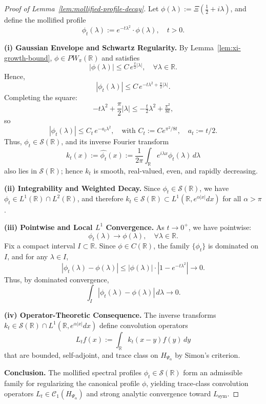 \begin{proof}[Proof of Lemma~\ref{lem:mollified-profile-decay}]
Let \( \phi(\lambda) := \Xi\left( \tfrac{1}{2} + i\lambda \right) \), and define the mollified profile
\[
\phi_t(\lambda) := e^{-t\lambda^2} \cdot \phi(\lambda), \quad t > 0.
\]

\medskip
\noindent\textbf{(i) Gaussian Envelope and Schwartz Regularity.}
By Lemma~\ref{lem:xi-growth-bound}, \( \phi \in PW_\pi(\mathbb{R}) \) and satisfies
\[
|\phi(\lambda)| \le C\, e^{\frac{\pi}{2} |\lambda|}, \quad \forall \lambda \in \mathbb{R}.
\]
Hence,
\[
|\phi_t(\lambda)| \le C\, e^{-t\lambda^2 + \frac{\pi}{2} |\lambda|}.
\]
Completing the square:
\[
-t\lambda^2 + \frac{\pi}{2}|\lambda| \le -\tfrac{t}{2}\lambda^2 + \tfrac{\pi^2}{8t},
\]
so
\[
|\phi_t(\lambda)| \le C_t\, e^{-a_t \lambda^2}, \quad \text{with } C_t := C e^{\pi^2/8t}, \quad a_t := t/2.
\]
Thus, \( \phi_t \in \mathcal{S}(\mathbb{R}) \), and its inverse Fourier transform
\[
k_t(x) := \widehat{\phi_t}(x) := \frac{1}{2\pi} \int_{\mathbb{R}} e^{i\lambda x} \phi_t(\lambda)\, d\lambda
\]
also lies in \( \mathcal{S}(\mathbb{R}) \); hence \( k_t \) is smooth, real-valued, even, and rapidly decreasing.

\medskip
\noindent\textbf{(ii) Integrability and Weighted Decay.}
Since \( \phi_t \in \mathcal{S}(\mathbb{R}) \), we have \( \phi_t \in L^1(\mathbb{R}) \cap L^2(\mathbb{R}) \), and therefore \( k_t \in \mathcal{S}(\mathbb{R}) \subset L^1(\mathbb{R}, e^{\alpha |x|} dx) \) for all \( \alpha > \pi \).

\medskip
\noindent\textbf{(iii) Pointwise and Local \( L^1 \) Convergence.}
As \( t \to 0^+ \), we have pointwise:
\[
\phi_t(\lambda) \to \phi(\lambda), \quad \forall \lambda \in \mathbb{R}.
\]
Fix a compact interval \( I \subset \mathbb{R} \). Since \( \phi \in C(\mathbb{R}) \), the family \( \{\phi_t\} \) is dominated on \( I \), and for any \( \lambda \in I \),
\[
|\phi_t(\lambda) - \phi(\lambda)| \le |\phi(\lambda)| \cdot |1 - e^{-t\lambda^2}| \to 0.
\]
Thus, by dominated convergence,
\[
\int_I |\phi_t(\lambda) - \phi(\lambda)|\, d\lambda \to 0.
\]

\medskip
\noindent\textbf{(iv) Operator-Theoretic Consequence.}
The inverse transforms \( k_t \in \mathcal{S}(\mathbb{R}) \cap L^1(\mathbb{R}, e^{\alpha |x|} dx) \) define convolution operators
\[
L_t f(x) := \int_{\mathbb{R}} k_t(x - y) f(y)\, dy
\]
that are bounded, self-adjoint, and trace class on \( H_{\Psi_\alpha} \) by Simon’s criterion.

\medskip
\noindent\textbf{Conclusion.}
The mollified spectral profiles \( \phi_t \in \mathcal{S}(\mathbb{R}) \) form an admissible family for regularizing the canonical profile \( \phi \), yielding trace-class convolution operators \( L_t \in \mathcal{C}_1(H_{\Psi_\alpha}) \) and strong analytic convergence toward \( L_{\mathrm{sym}} \).
\end{proof}
